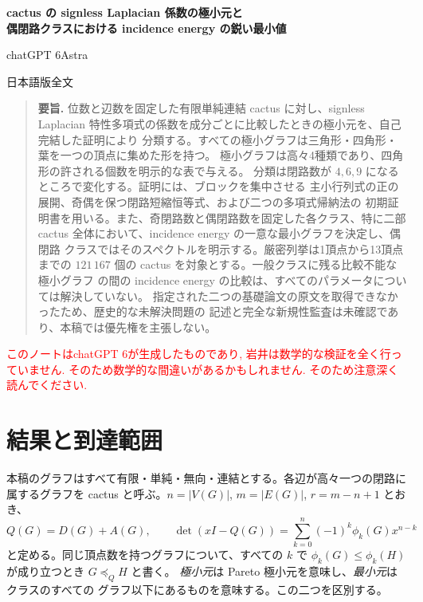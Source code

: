 \documentclass[12pt]{amsart}
\theoremstyle{definition}
\theoremstyle{remark}
\numberwithin{equation}{section}
\newcommand{\xr}[1]{\textcolor{red}{#1}}
\providecommand{\theHthm}{}
\renewcommand{\theHthm}{en.\thesection.\arabic{thm}}
\renewcommand{\theHsection}{en.\arabic{section}}
\renewcommand{\theHequation}{en.\thesection.\arabic{equation}}
\begin{document}
\newpage
\setcounter{section}{0}
\setcounter{thm}{0}
\setcounter{equation}{0}
\renewcommand{\thesection}{\arabic{section}}
\renewcommand{\sectionname}{}
\renewcommand{\appendixname}{付録}
\renewcommand{\proofname}{証明}
\renewcommand{\refname}{参考文献}
\renewcommand{\theHsection}{ja.\arabic{section}}
\renewcommand{\theHthm}{ja.\thesection.\arabic{thm}}
\renewcommand{\theHequation}{ja.\thesection.\arabic{equation}}
\begin{center}
{\Large\bfseries cactus の signless Laplacian 係数の極小元と\\
偶閉路クラスにおける incidence energy の鋭い最小値}\par\medskip
{\large chatGPT 6Astra}\par\medskip
日本語版全文
\end{center}
\begin{quotation}\small
\textbf{要旨.}
位数と辺数を固定した有限単純連結 cactus に対し、signless Laplacian
特性多項式の係数を成分ごとに比較したときの極小元を、自己完結した証明により
分類する。すべての極小グラフは三角形・四角形・葉を一つの頂点に集めた形を持つ。
極小グラフは高々4種類であり、四角形の許される個数を明示的な表で与える。
分類は閉路数が $4,6,9$ になるところで変化する。証明には、ブロックを集中させる
主小行列式の正の展開、奇偶を保つ閉路短縮恒等式、および二つの多項式帰納法の
初期証明書を用いる。また、奇閉路数と偶閉路数を固定した各クラス、特に二部
cactus 全体において、incidence energy の一意な最小グラフを決定し、偶閉路
クラスではそのスペクトルを明示する。厳密列挙は1頂点から13頂点までの
$121\,167$ 個の cactus を対象とする。一般クラスに残る比較不能な極小グラフ
の間の incidence energy の比較は、すべてのパラメータについては解決していない。
指定された二つの基礎論文の原文を取得できなかったため、歴史的な未解決問題の
記述と完全な新規性監査は未確認であり、本稿では優先権を主張しない。
\end{quotation}


\xr{このノートはchatGPT 6が生成したものであり, 岩井は数学的な検証を全く行っていません. そのため数学的な間違いがあるかもしれません. そのため注意深く読んでください.}


\section{結果と到達範囲}
本稿のグラフはすべて有限・単純・無向・連結とする。各辺が高々一つの閉路に
属するグラフを cactus と呼ぶ。$n=|V(G)|$, $m=|E(G)|$, $r=m-n+1$ とおき、
\[
 Q(G)=D(G)+A(G),\qquad
 \det(xI-Q(G))=\sum_{k=0}^n(-1)^k\phi_k(G)x^{n-k}
\]
と定める。同じ頂点数を持つグラフについて、すべての $k$ で
$\phi_k(G)\le\phi_k(H)$ が成り立つとき $G\preceq_Q H$ と書く。
\emph{極小元}は Pareto 極小元を意味し、\emph{最小元}はクラスのすべての
グラフ以下にあるものを意味する。この二つを区別する。
\end{document}
